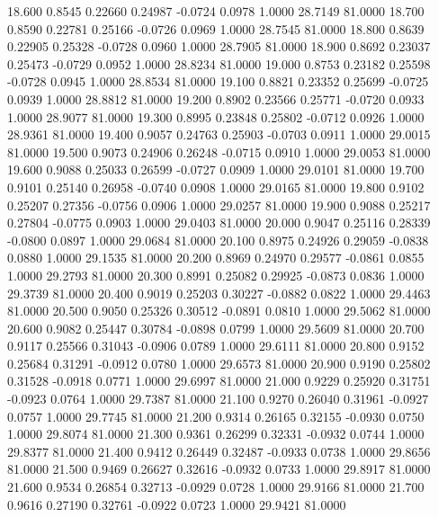   18.600   0.8545   0.22660   0.24987  -0.0724   0.0978   1.0000  28.7149  81.0000
  18.700   0.8590   0.22781   0.25166  -0.0726   0.0969   1.0000  28.7545  81.0000
  18.800   0.8639   0.22905   0.25328  -0.0728   0.0960   1.0000  28.7905  81.0000
  18.900   0.8692   0.23037   0.25473  -0.0729   0.0952   1.0000  28.8234  81.0000
  19.000   0.8753   0.23182   0.25598  -0.0728   0.0945   1.0000  28.8534  81.0000
  19.100   0.8821   0.23352   0.25699  -0.0725   0.0939   1.0000  28.8812  81.0000
  19.200   0.8902   0.23566   0.25771  -0.0720   0.0933   1.0000  28.9077  81.0000
  19.300   0.8995   0.23848   0.25802  -0.0712   0.0926   1.0000  28.9361  81.0000
  19.400   0.9057   0.24763   0.25903  -0.0703   0.0911   1.0000  29.0015  81.0000
  19.500   0.9073   0.24906   0.26248  -0.0715   0.0910   1.0000  29.0053  81.0000
  19.600   0.9088   0.25033   0.26599  -0.0727   0.0909   1.0000  29.0101  81.0000
  19.700   0.9101   0.25140   0.26958  -0.0740   0.0908   1.0000  29.0165  81.0000
  19.800   0.9102   0.25207   0.27356  -0.0756   0.0906   1.0000  29.0257  81.0000
  19.900   0.9088   0.25217   0.27804  -0.0775   0.0903   1.0000  29.0403  81.0000
  20.000   0.9047   0.25116   0.28339  -0.0800   0.0897   1.0000  29.0684  81.0000
  20.100   0.8975   0.24926   0.29059  -0.0838   0.0880   1.0000  29.1535  81.0000
  20.200   0.8969   0.24970   0.29577  -0.0861   0.0855   1.0000  29.2793  81.0000
  20.300   0.8991   0.25082   0.29925  -0.0873   0.0836   1.0000  29.3739  81.0000
  20.400   0.9019   0.25203   0.30227  -0.0882   0.0822   1.0000  29.4463  81.0000
  20.500   0.9050   0.25326   0.30512  -0.0891   0.0810   1.0000  29.5062  81.0000
  20.600   0.9082   0.25447   0.30784  -0.0898   0.0799   1.0000  29.5609  81.0000
  20.700   0.9117   0.25566   0.31043  -0.0906   0.0789   1.0000  29.6111  81.0000
  20.800   0.9152   0.25684   0.31291  -0.0912   0.0780   1.0000  29.6573  81.0000
  20.900   0.9190   0.25802   0.31528  -0.0918   0.0771   1.0000  29.6997  81.0000
  21.000   0.9229   0.25920   0.31751  -0.0923   0.0764   1.0000  29.7387  81.0000
  21.100   0.9270   0.26040   0.31961  -0.0927   0.0757   1.0000  29.7745  81.0000
  21.200   0.9314   0.26165   0.32155  -0.0930   0.0750   1.0000  29.8074  81.0000
  21.300   0.9361   0.26299   0.32331  -0.0932   0.0744   1.0000  29.8377  81.0000
  21.400   0.9412   0.26449   0.32487  -0.0933   0.0738   1.0000  29.8656  81.0000
  21.500   0.9469   0.26627   0.32616  -0.0932   0.0733   1.0000  29.8917  81.0000
  21.600   0.9534   0.26854   0.32713  -0.0929   0.0728   1.0000  29.9166  81.0000
  21.700   0.9616   0.27190   0.32761  -0.0922   0.0723   1.0000  29.9421  81.0000

